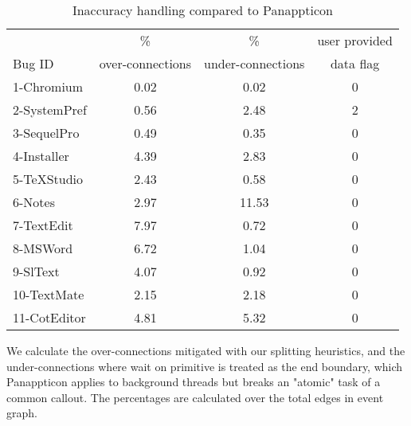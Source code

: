 
\begin{table}[ht]
\footnotesize
\centering
  \begin{tabularx}{\columnwidth}{l|ccc}
  \hline
       & \% & \% & user provided \\
Bug ID & over-connections& under-connections & data flag \\
\hline
\hline
1-Chromium & 0.02 & 0.02 & 0 \\
2-SystemPref & 0.56 & 2.48 & 2 \\
3-SequelPro & 0.49 & 0.35 & 0 \\
4-Installer & 4.39 & 2.83 & 0 \\
5-TeXStudio & 2.43 & 0.58 & 0 \\
6-Notes & 2.97 & 11.53 & 0 \\
7-TextEdit & 7.97 & 0.72 & 0 \\
8-MSWord & 6.72 & 1.04 & 0 \\
9-SlText & 4.07 & 0.92 & 0 \\
10-TextMate & 2.15 & 2.18 & 0 \\
11-CotEditor & 4.81 & 5.32 & 0 \\
\hline
  \end{tabularx}

  \parbox{\columnwidth}
  {\caption{Inaccuracy handling compared to Panappticon} 
  	{
		We calculate the over-connections mitigated with our splitting heuristics, and
	the under-connections where wait on primitive is treated as the end boundary,
	which Panappticon applies to background threads but breaks an "atomic" task
	of a common callout. The percentages are calculated over the total edges in event graph.
    }
  \label{table:statistics}
  }
\end{table}


